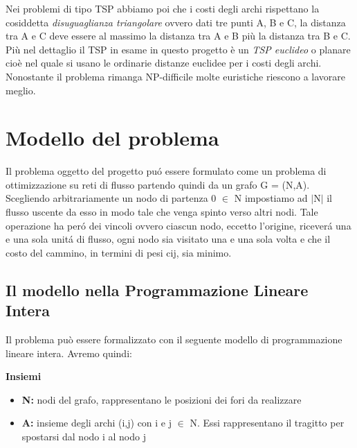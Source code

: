 \documentclass[preprint,12pt]{elsarticle}
\begin{document}
Nei problemi di tipo TSP abbiamo poi che i costi degli archi rispettano la cosiddetta \textit{disuguaglianza triangolare} ovvero dati tre punti A, B e C, la distanza tra A e C deve essere al massimo la distanza tra A e B più la distanza tra B e C. Più nel dettaglio il TSP in esame in questo progetto è un \textit{TSP euclideo} o planare cioè nel quale si usano le ordinarie distanze euclidee per i costi degli archi. Nonostante il problema rimanga NP-difficile molte euristiche riescono a lavorare meglio. 


\section{Modello del problema}
\label{S:1}
Il problema oggetto del progetto pu\'o essere formulato come un problema di ottimizzazione su reti di flusso partendo quindi da un grafo G = (N,A). Scegliendo arbitrariamente un nodo di partenza 0 $\in$ N impostiamo ad $\mid$N$\mid$ il flusso uscente da esso in modo tale che venga spinto verso altri nodi. Tale operazione ha per\'o dei vincoli ovvero ciascun nodo, eccetto l'origine, ricever\'a una e una sola unit\'a di flusso, ogni nodo sia visitato una e una sola volta e che il costo del cammino, in termini di pesi c{\tiny ij}, sia minimo.

\subsection{\textbf{Il modello nella Programmazione Lineare Intera}}

Il problema può essere formalizzato con il seguente modello di programmazione lineare intera. Avremo quindi:
\\

\begin{large}
\textbf{Insiemi}
\end{large}

\begin{itemize}
\item \textbf{N:} nodi del grafo, rappresentano le posizioni dei fori da realizzare
\item \textbf{A:} insieme degli archi (i,j) con i e j $\in$ N. Essi rappresentano il tragitto per spostarsi dal nodo i al nodo j\\

\end{itemize}
\end{document}
